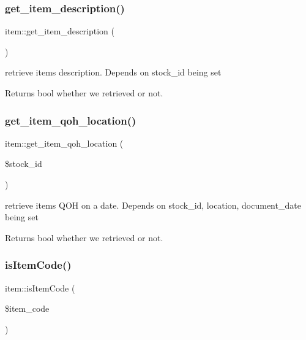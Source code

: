 \subsubsection{\texorpdfstring{get\+\_\+item\+\_\+description()}{get\_item\_description()}}
{\footnotesize\ttfamily item\+::get\+\_\+item\+\_\+description (\begin{DoxyParamCaption}{ }\end{DoxyParamCaption})}

retrieve item\textquotesingle{}s description. Depends on stock\+\_\+id being set

\begin{DoxyReturn}{Returns}
bool whether we retrieved or not. 
\end{DoxyReturn}
\hypertarget{classitem_aa76507a7473d77d4f2472616abcb664f}{}\label{classitem_aa76507a7473d77d4f2472616abcb664f} 
\subsubsection{\texorpdfstring{get\+\_\+item\+\_\+qoh\+\_\+location()}{get\_item\_qoh\_location()}}
{\footnotesize\ttfamily item\+::get\+\_\+item\+\_\+qoh\+\_\+location (\begin{DoxyParamCaption}\item[{}]{\$stock\+\_\+id }\end{DoxyParamCaption})}

retrieve item\textquotesingle{}s Q\+OH on a date. Depends on stock\+\_\+id, location, document\+\_\+date being set

\begin{DoxyReturn}{Returns}
bool whether we retrieved or not. 
\end{DoxyReturn}
\hypertarget{classitem_a9d1f895627df632f2134f0161d5da726}{}\label{classitem_a9d1f895627df632f2134f0161d5da726} 
\subsubsection{\texorpdfstring{is\+Item\+Code()}{isItemCode()}}
{\footnotesize\ttfamily item\+::is\+Item\+Code (\begin{DoxyParamCaption}\item[{}]{\$item\+\_\+code }\end{DoxyParamCaption})}

